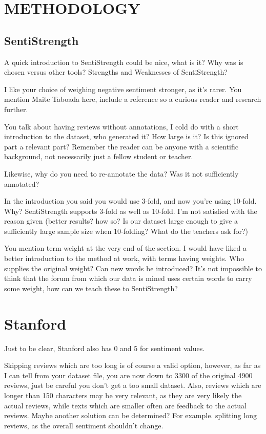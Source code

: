 \documentclass[11pt]{article} %
\begin{document}
\section*{METHODOLOGY}
\subsection*{SentiStrength}
A quick introduction to SentiStrength could be nice, what is it? Why was is chosen versus other tools? Strengths and Weaknesses of SentiStrength?

I like your choice of weighing negative sentiment stronger, as it's rarer. You mention Maite Taboada here, include a reference so a curious reader and research further.

You talk about having reviews without annotations, I cold do with a short introduction to the dataset, who generated it? How large is it? Is this ignored part a relevant part? Remember the reader can be anyone with a scientific background, not necessarily just a fellow student or teacher.

Likewise, why do you need to re-annotate the data? Was it not sufficiently annotated?

In the introduction you said you would use 3-fold, and now you're using 10-fold. Why? SentiStrength supports 3-fold as well as 10-fold. I'm not satisfied with the reason given (better results? how so? Is our dataset large enough to give a sufficiently large sample size when 10-folding? What do the teachers ask for?)

You mention term weight at the very end of the section. I would have liked a better introduction to the method at work, with terms having weights. Who supplies the original weight? Can new words be introduced? It's not impossible to think that the forum from which our data is mined uses certain words to carry some weight, how can we teach these to SentiStrength?

\section*{Stanford}
Just to be clear, Stanford also has 0 and 5 for sentiment values.

Skipping reviews which are too long is of course a valid option, however, as far as I can tell from your dataset file, you are now down to 3300 of the original 4900 reviews, just be careful you don't get a too small dataset. Also, reviews which are longer than 150 characters may be very relevant, as they are very likely the actual reviews, while texts which are smaller often are feedback to the actual reviews. Maybe another solution can be determined? For example. splitting long reviews, as the overall sentiment shouldn't change.
\end{document}
